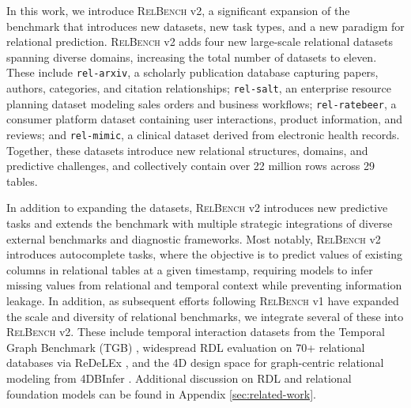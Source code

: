 \documentclass{article} %
\newcommand{\relbench}{\textsc{RelBench}\xspace}
\newcommand{\salt}{\texttt{rel-salt}\xspace}
\newcommand{\ratebeer}{\texttt{rel-ratebeer}\xspace}
\newcommand{\mimic}{\texttt{rel-mimic}\xspace}
\newcommand{\arxiv}{\texttt{rel-arxiv}\xspace}
\begin{document}
In this work, we introduce  \relbench v2, a significant expansion of the benchmark that introduces new datasets, new task types, and a new paradigm for relational prediction. \relbench v2 adds four new large-scale relational datasets spanning diverse domains, increasing the total number of datasets to eleven. These include \arxiv, a scholarly publication database capturing papers, authors, categories, and citation relationships; \salt, an enterprise resource planning dataset modeling sales orders and business workflows; \ratebeer, a consumer platform dataset containing user interactions, product information, and reviews; and \mimic, a clinical dataset derived from electronic health records. Together, these datasets introduce new relational structures, domains, and predictive challenges, and collectively contain over 22 million rows across 29 tables. 

In addition to expanding the datasets, \relbench v2 introduces new predictive tasks and extends the benchmark with multiple strategic integrations of diverse external benchmarks and diagnostic frameworks. Most notably, \relbench v2 introduces autocomplete tasks, where the objective is to predict values of existing columns in relational tables at a given timestamp, requiring models to infer missing values from relational and temporal context while preventing information leakage. In addition, as subsequent efforts following \relbench v1 have expanded the scale and diversity of relational benchmarks, we integrate several of these into \relbench v2. These include temporal interaction datasets from the Temporal Graph Benchmark (TGB) \citep{rossi2020temporal}, widespread RDL evaluation on 70+ relational databases via ReDeLEx \citep{peleska2025redelex}, and the 4D design space for graph-centric relational modeling from 4DBInfer \citep{wang20244dbinfer}. Additional discussion on RDL and relational foundation models can be found in Appendix \ref{sec:related-work}.


\end{document}
